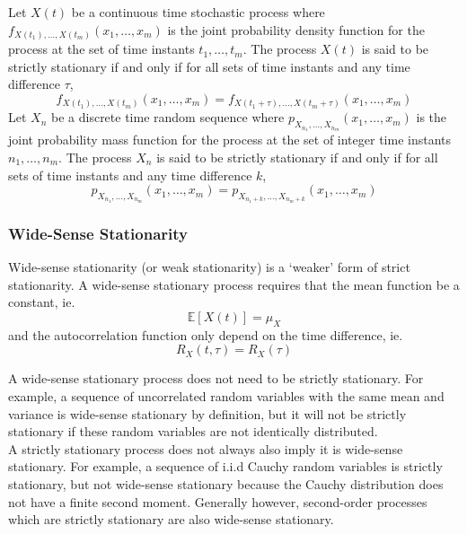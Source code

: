 \documentclass[11pt]{report} %
\begin{document}
Let $X\left(t\right)$ be a continuous time stochastic process where $f_{X\left(t_{1}\right), \dots, X\left(t_{m}\right)}\left(x_{1}, \dots, x_{m}\right)$ is the joint probability density function for the process at the set of time instants $t_{1}, \dots, t_{m}$. The process $X\left(t\right)$ is said to be strictly stationary if and only if for all sets of time instants and any time difference $\tau$,
\begin{equation}
f_{X\left(t_{1}\right), \dots, X\left(t_{m}\right)}\left(x_{1}, \dots, x_{m}\right) = f_{X\left(t_{1} + \tau\right), \dots, X\left(t_{m} + \tau\right)}\left(x_{1}, \dots, x_{m}\right)
\end{equation}
Let $X_{n}$ be a discrete time random sequence where $p_{X_{n_{1}}, \dots, X_{n_{m}}}\left(x_{1}, \dots, x_{m}\right)$ is the joint probability mass function for the process at the set of integer time instants $n_{1}, \dots, n_{m}$. The process $X_{n}$ is said to be strictly stationary if and only if for all sets of time instants and any time difference $k$,
\begin{equation}
p_{X_{n_{1}}, \dots, X_{n_{m}}}\left(x_{1}, \dots, x_{m}\right) = p_{X_{n_{1} + k}, \dots, X_{n_{m} + k}}\left(x_{1}, \dots, x_{m}\right)
\end{equation}

\subsubsection{Wide-Sense Stationarity}

Wide-sense stationarity (or weak stationarity) is a `weaker' form of strict stationarity. A wide-sense stationary process requires that the mean function be a constant, ie.
\begin{equation}
\mathbb{E}\left[X\left(t\right)\right] = \mu_{X}
\end{equation}
and the autocorrelation function only depend on the time difference, ie.
\begin{equation}
R_{X}\left(t, \tau\right) = R_{X}\left(\tau\right)
\end{equation}

A wide-sense stationary process does not need to be strictly stationary. For example, a sequence of uncorrelated random variables with the same mean and variance is wide-sense stationary by definition, but it will not be strictly stationary if these random variables are not identically distributed. \\

A strictly stationary process does not always also imply it is wide-sense stationary. For example, a sequence of i.i.d Cauchy random variables is strictly stationary, but not wide-sense stationary because the Cauchy distribution does not have a finite second moment. Generally however, second-order processes which are strictly stationary are also wide-sense stationary.
\end{document}

